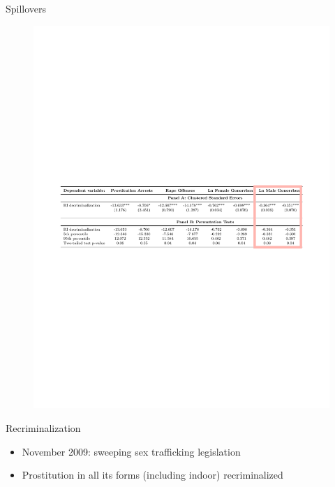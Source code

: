 \documentclass{beamer}
\begin{document}
\begin{frame}{Spillovers}
	\begin{figure}
	\includegraphics[scale=0.65]{./lecture_includes/table6a.pdf}
	\end{figure}
\end{frame}


\begin{frame}{Recriminalization}

	\begin{itemize}
	\item November 2009: sweeping sex trafficking legislation
	\item Prostitution in all its forms (including indoor) recriminalized
	\end{itemize}
\end{frame}
\end{document}
